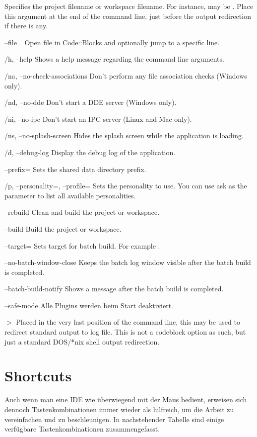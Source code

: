 \begin{optentry}
\item[\var{filename}] Specifies the project  filename or workspace  filename. For instance,  may be . Place this argument at the end of the command line, just before the output redirection if there is any.
\item[--file=\var{filename}\optional{:line}] Open file in Code::Blocks and optionally jump to a specific line.
\item[/h, --help] Shows a help message regarding the command line arguments.
\item[/na, --no-check-associations] Don't perform any file association checks (Windows only).
\item[/nd, --no-dde] Don't start a DDE server (Windows only).
\item[/ni, --no-ipc] Don't start an IPC server (Linux and Mac only).
\item[/ns, --no-splash-screen] Hides the splash screen while the application is loading.
\item[/d, --debug-log] Display the debug log of the application.
\item[--prefix=\var{str}] Sets the shared data directory prefix.
\item[/p, --personality=\var{str}, --profile=\var{str}] Sets the personality to use. You can use ask as the parameter to list all available personalities.
\item[--rebuild] Clean and build the project or workspace.
\item[--build] Build the project or workspace.
\item[--target=\var{str}] Sets target for batch build. For example .
\item[--no-batch-window-close] Keeps the batch log window visible after the batch build is completed.
\item[--batch-build-notify] Shows a message after the batch build is completed.
\item[--safe-mode] Alle Plugins werden beim Start deaktiviert.
\item[$>$ \var{build log file}] Placed in the very last position of the command line, this may be used to redirect standard output to log file. This is not a codeblock option as such, but just a standard DOS/*nix shell output redirection.
\end{optentry}

\section{Shortcuts}

Auch wenn man eine IDE wie \codeblocks überwiegend mit der Maus bedient, erweisen sich dennoch Tastenkombinationen immer wieder als hilfreich, um die Arbeit zu vereinfachen und zu beschleunigen. In nachstehender Tabelle sind einige verfügbare Tastenkombinationen zusammengefasst.


